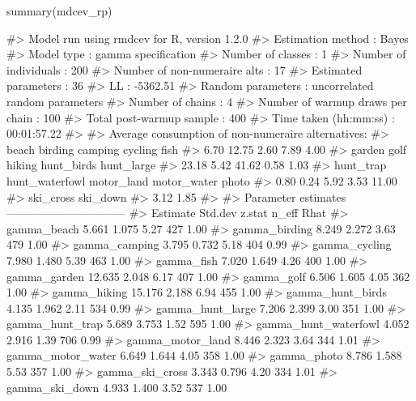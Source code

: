 \begin{Schunk}
\begin{Sinput}
summary(mdcev_rp)
\end{Sinput}
\begin{Soutput}
#> Model run using rmdcev for R, version 1.2.0 
#> Estimation method                : Bayes
#> Model type                       : gamma specification
#> Number of classes                : 1
#> Number of individuals            : 200
#> Number of non-numeraire alts     : 17
#> Estimated parameters             : 36
#> LL                               : -5362.51
#> Random parameters                : uncorrelated random parameters
#> Number of chains                 : 4
#> Number of warmup draws per chain : 100
#> Total post-warmup sample         : 400
#> Time taken (hh:mm:ss)            : 00:01:57.22
#> 
#> Average consumption of non-numeraire alternatives:
#>          beach        birding        camping        cycling           fish 
#>           6.70          12.75           2.60           7.89           4.00 
#>         garden           golf         hiking     hunt_birds     hunt_large 
#>          23.18           5.42          41.62           0.58           1.03 
#>      hunt_trap hunt_waterfowl     motor_land    motor_water          photo 
#>           0.80           0.24           5.92           3.53          11.00 
#>      ski_cross       ski_down 
#>           3.12           1.85 
#> 
#> Parameter estimates --------------------------------  
#>                         Estimate Std.dev z.stat n_eff Rhat
#> gamma_beach                5.661   1.075   5.27   427 1.00
#> gamma_birding              8.249   2.272   3.63   479 1.00
#> gamma_camping              3.795   0.732   5.18   404 0.99
#> gamma_cycling              7.980   1.480   5.39   463 1.00
#> gamma_fish                 7.020   1.649   4.26   400 1.00
#> gamma_garden              12.635   2.048   6.17   407 1.00
#> gamma_golf                 6.506   1.605   4.05   362 1.00
#> gamma_hiking              15.176   2.188   6.94   455 1.00
#> gamma_hunt_birds           4.135   1.962   2.11   534 0.99
#> gamma_hunt_large           7.206   2.399   3.00   351 1.00
#> gamma_hunt_trap            5.689   3.753   1.52   595 1.00
#> gamma_hunt_waterfowl       4.052   2.916   1.39   706 0.99
#> gamma_motor_land           8.446   2.323   3.64   344 1.01
#> gamma_motor_water          6.649   1.644   4.05   358 1.00
#> gamma_photo                8.786   1.588   5.53   357 1.00
#> gamma_ski_cross            3.343   0.796   4.20   334 1.01
#> gamma_ski_down             4.933   1.400   3.52   537 1.00

\end{Soutput}
\end{Schunk}
